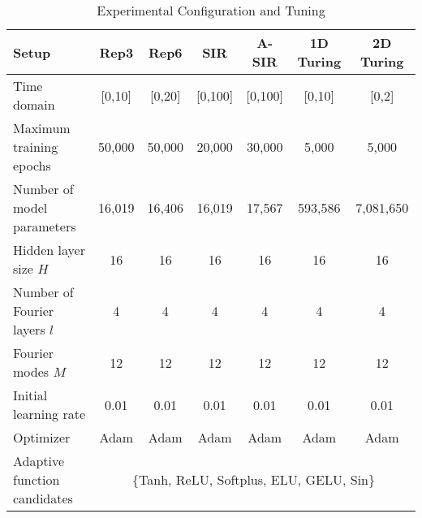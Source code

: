 
\begin{table*}[!htb]
\footnotesize
\caption[Experimental Configuration and Tuning] {Experimental Configuration and Tuning}
\label{tab:setup}
\begin{tabular}{ l cccccc } 
\toprule

Setup & Rep3 & Rep6 &  SIR & A-SIR & 1D Turing & 2D Turing \\
\midrule 
\midrule
Time domain & [0,10] & [0,20] & [0,100] & [0,100] & [0,10] & [0,2] \\
Maximum training epochs & 50,000 & 50,000 & 20,000 & 30,000 & 5,000 & 5,000 \\
Number of model parameters & 16,019 & 16,406 & 16,019 & 17,567 & 593,586 & 7,081,650 \\
Hidden layer size $H$ & 16 & 16 & 16 & 16 & 16 & 16 \\
Number of Fourier layers $l$ & 4 & 4 & 4 & 4 & 4 & 4 \\
Fourier modes $M$ & 12 & 12 & 12 & 12 & 12 & 12 \\
Initial learning rate & 0.01 & 0.01 & 0.01 & 0.01 & 0.01 & 0.01 \\
Optimizer & Adam & Adam & Adam & Adam & Adam & Adam \\
Adaptive function candidates & \multicolumn{6}{c}{\{Tanh, ReLU, Softplus, ELU, GELU, Sin\}} \\
\bottomrule
\end{tabular}%
\end{table*}

